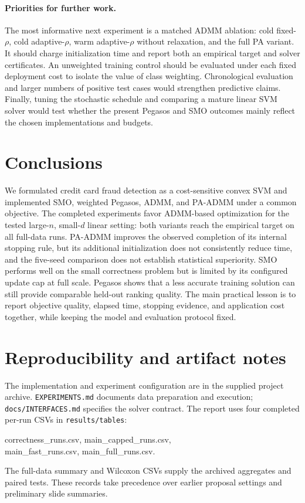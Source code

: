 \documentclass{article}
\begin{document}
\paragraph{Priorities for further work.}
The most informative next experiment is a matched ADMM ablation: cold fixed-$\rho$, cold adaptive-$\rho$, warm adaptive-$\rho$ without relaxation, and the full PA variant. It should charge initialization time and report both an empirical target and solver certificates. An unweighted training control should be evaluated under each fixed deployment cost to isolate the value of class weighting. Chronological evaluation and larger numbers of positive test cases would strengthen predictive claims. Finally, tuning the stochastic schedule and comparing a mature linear SVM solver would test whether the present Pegasos and SMO outcomes mainly reflect the chosen implementations and budgets.

\section{Conclusions}

We formulated credit card fraud detection as a cost-sensitive convex SVM and implemented SMO, weighted Pegasos, ADMM, and PA-ADMM under a common objective. The completed experiments favor ADMM-based optimization for the tested large-$n$, small-$d$ linear setting: both variants reach the empirical target on all full-data runs. PA-ADMM improves the observed completion of its internal stopping rule, but its additional initialization does not consistently reduce time, and the five-seed comparison does not establish statistical superiority. SMO performs well on the small correctness problem but is limited by its configured update cap at full scale. Pegasos shows that a less accurate training solution can still provide comparable held-out ranking quality. The main practical lesson is to report objective quality, elapsed time, stopping evidence, and application cost together, while keeping the model and evaluation protocol fixed.

\section*{Reproducibility and artifact notes}

{\raggedright
The implementation and experiment configuration are in the supplied project archive. \texttt{EXPERIMENTS.md} documents data preparation and execution; \texttt{docs/INTERFACES.md} specifies the solver contract. The report uses four completed per-run CSVs in \texttt{results/tables}:\par
{\small\ttfamily correctness\_runs.csv, main\_capped\_runs.csv,\\
main\_fast\_runs.csv, main\_full\_runs.csv.}\par
The full-data summary and Wilcoxon CSVs supply the archived aggregates and paired tests. These records take precedence over earlier proposal settings and preliminary slide summaries.\par}
\end{document}
